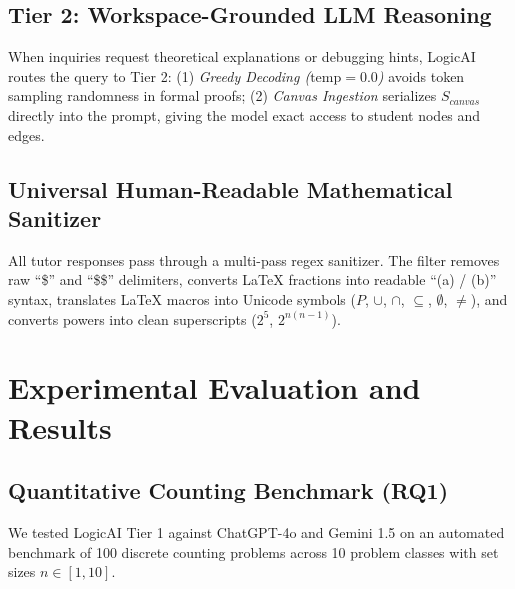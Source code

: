 \documentclass[conference]{IEEEtran}
\begin{document}
\subsection{Tier 2: Workspace-Grounded LLM Reasoning}
When inquiries request theoretical explanations or debugging hints, LogicAI routes the query to Tier 2: (1) \textit{Greedy Decoding ($\text{temp} = 0.0$)} avoids token sampling randomness in formal proofs; (2) \textit{Canvas Ingestion} serializes $S_{canvas}$ directly into the prompt, giving the model exact access to student nodes and edges.

\subsection{Universal Human-Readable Mathematical Sanitizer}
All tutor responses pass through a multi-pass regex sanitizer. The filter removes raw ``\$'' and ``\$\$'' delimiters, converts \LaTeX{} fractions into readable ``(a) / (b)'' syntax, translates \LaTeX{} macros into Unicode symbols ($P$, $\cup$, $\cap$, $\subseteq$, $\emptyset$, $\neq$), and converts powers into clean superscripts ($2^5$, $2^{n(n-1)}$).

\section{Experimental Evaluation and Results}
\subsection{Quantitative Counting Benchmark (RQ1)}
We tested LogicAI Tier 1 against ChatGPT-4o and Gemini 1.5 on an automated benchmark of 100 discrete counting problems across 10 problem classes with set sizes $n \in [1, 10]$.
\end{document}
